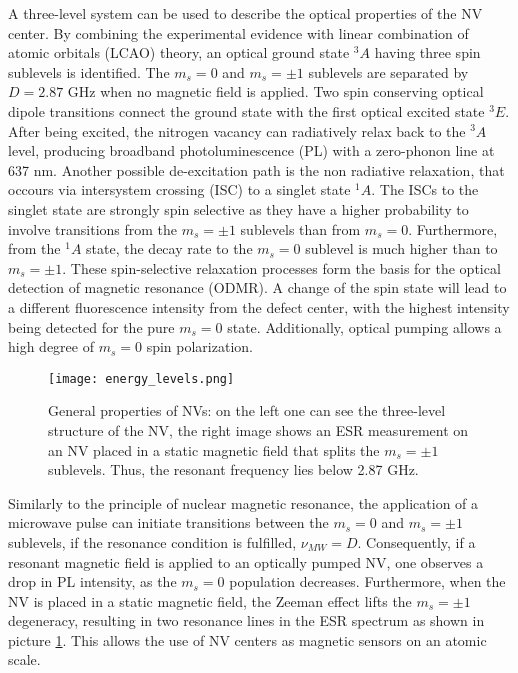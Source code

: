 \documentclass[12pt,a4paper]{article}
\begin{document}
A three-level system can be used to describe the optical properties of the NV center. By combining the experimental evidence with linear combination of atomic orbitals (LCAO) theory\cite{lar}, an optical ground state $^3A$ having three spin sublevels is identified. The $m_s=0$ and $m_s= \pm 1$ sublevels are separated by $D=2.87$ GHz when no magnetic field is applied. Two spin conserving optical dipole transitions connect the ground state with the first optical excited state $^3E$. After being excited, the nitrogen vacancy can radiatively relax back to the $^3A$ level, producing broadband photoluminescence (PL) with a zero-phonon line at 637 nm. Another possible de-excitation path is the non radiative relaxation, that occours via intersystem crossing (ISC) to a singlet state $^1A$. The ISCs to the singlet state are strongly spin selective as they have a higher probability to involve transitions from the $m_s=\pm 1$ sublevels than from $m_s=0$. Furthermore, from the $^1A$ state, the decay rate to the $m_s=0$ sublevel is much higher than to $m_s=\pm 1$. These spin-selective relaxation processes form the basis for the optical detection of magnetic resonance (ODMR). A change of the spin state will lead to a different fluorescence intensity from the defect center, with the highest intensity being detected for the pure $m_s=0$ state. Additionally, optical pumping allows a high degree of $m_s=0$ spin polarization. \\
\begin{figure}[H]
\centering
\texttt{[image: energy\_levels.png]} 
\caption{General properties of NVs: on the left one can see the three-level structure of the NV, the right image shows an ESR measurement on an NV placed in a static magnetic field that splits the $m_s=\pm1$ sublevels. Thus, the resonant frequency lies below 2.87 GHz.}
\label{el}
\end{figure}
Similarly to the principle of nuclear magnetic resonance, the application of a microwave pulse can initiate transitions between the $m_s=0$ and $m_s=\pm1$ sublevels, if the resonance condition is fulfilled, $\nu_{MW}=D$. Consequently, if a resonant magnetic field is applied to an optically pumped NV, one observes a drop in PL intensity, as the $m_s=0$ population decreases. Furthermore, when the NV is placed in a static magnetic field, the Zeeman effect lifts the $m_s=\pm 1$ degeneracy, resulting in two resonance lines in the ESR spectrum as shown in picture \ref{el}. This allows the use of NV centers as magnetic sensors on an atomic scale. \\
\end{document}

